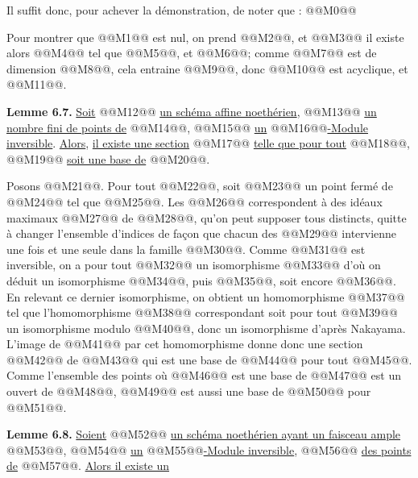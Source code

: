 
Il suffit donc, pour achever la démonstration, de noter que :
@@M0@@

Pour montrer que @@M1@@ est nul, on prend @@M2@@, et @@M3@@ il existe alors @@M4@@ tel que @@M5@@, et @@M6@@; comme @@M7@@ est de dimension @@M8@@, cela entraine @@M9@@, donc @@M10@@ est acyclique, et @@M11@@.

\textbf{Lemme 6.7.} \uline{Soit} @@M12@@ \uline{un schéma affine noethérien}, @@M13@@ \uline{un nombre fini de points de} @@M14@@, @@M15@@ \uline{un} @@M16@@\uline{-Module inversible}. \uline{Alors}, \uline{il existe une section} @@M17@@ \uline{telle que pour tout} @@M18@@, @@M19@@ \uline{soit une base de} @@M20@@.

Posons @@M21@@. Pour tout @@M22@@, soit @@M23@@ un point fermé de @@M24@@ tel que @@M25@@. Les @@M26@@ correspondent à des idéaux maximaux @@M27@@ de @@M28@@, qu'on peut supposer tous distincts, quitte à changer l'ensemble d'indices de façon que chacun des @@M29@@ intervienne une fois et une seule dans la famille @@M30@@. Comme @@M31@@ est inversible, on a pour tout @@M32@@ un isomorphisme @@M33@@ d'où on déduit un isomorphisme @@M34@@, puis @@M35@@, soit encore @@M36@@. En relevant ce dernier isomorphisme, on obtient un homomorphisme @@M37@@ tel que l'homomorphisme @@M38@@ correspondant soit pour tout @@M39@@ un isomorphisme modulo @@M40@@, donc un isomorphisme d'après Nakayama. L'image de @@M41@@ par cet homomorphisme donne donc une section @@M42@@ de @@M43@@ qui est une base de @@M44@@ pour tout @@M45@@. Comme l'ensemble des points où @@M46@@ est une base de @@M47@@ est un ouvert de @@M48@@, @@M49@@ est aussi une base de @@M50@@ pour @@M51@@.

\textbf{Lemme 6.8.} \uline{Soient} @@M52@@ \uline{un schéma noethérien ayant un faisceau ample} @@M53@@, @@M54@@ \uline{un} @@M55@@\uline{-Module inversible}, @@M56@@ \uline{des points de} @@M57@@. \uline{Alors il existe un}
